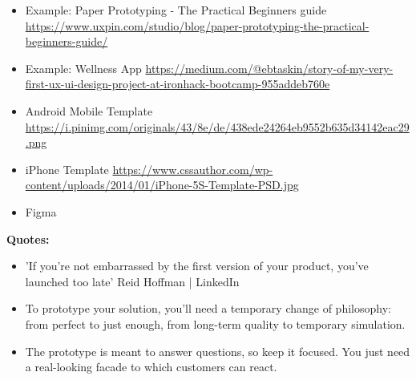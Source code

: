 \begin{itemize}
\item Example: Paper Prototyping - The Practical Beginners guide \url{https://www.uxpin.com/studio/blog/paper-prototyping-the-practical-beginners-guide/}
\item Example: Wellness App \url{https://medium.com/@ebtaskin/story-of-my-very-first-ux-ui-design-project-at-ironhack-bootcamp-955addeb760e}
\item Android Mobile Template \url{https://i.pinimg.com/originals/43/8e/de/438ede24264eb9552b635d34142eac29.png}
\item iPhone Template \url{https://www.cssauthor.com/wp-content/uploads/2014/01/iPhone-5S-Template-PSD.jpg}
\item Figma
\end{itemize}

\textbf{Quotes:}

\begin{itemize}
\item 'If you're not embarrassed by the first version of your product, you've launched too late' Reid Hoffman | LinkedIn
\item To prototype your solution, you'll need a temporary change of philosophy: from perfect to just enough, from long-term quality to temporary simulation.
\item The prototype is meant to answer questions, so keep it focused. You just need a real-looking facade to which customers can react.
\end{itemize}

